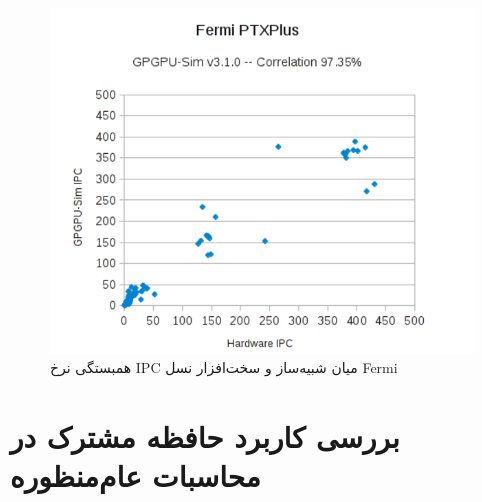 \documentclass{thesis}
\begin{document}
\begin{figure}[h]
\centering
\includegraphics[width=\textwidth]{./pics/7}
\caption{همبستگی نرخ 
IPC
میان شبیه‌ساز و سخت‌افزار نسل
Fermi
}
\label{ipccorrelation}
\end{figure}

\section{
بررسی کاربرد حافظه مشترک در محاسبات عام‌منظوره
}
\end{document}
